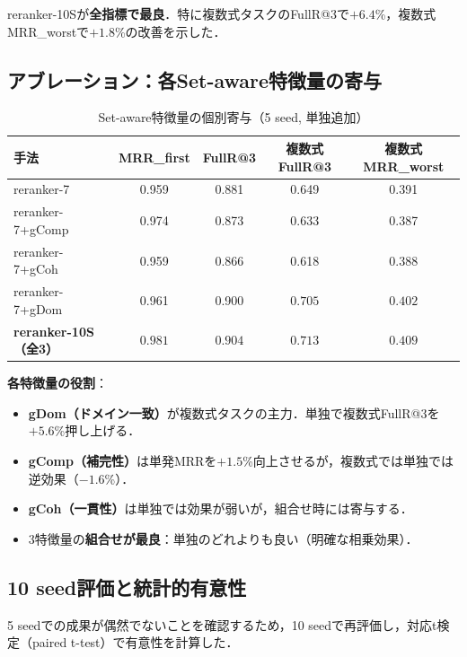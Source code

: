 \documentclass[11pt,a4paper]{ltjsarticle}
\begin{document}
reranker-10Sが\textbf{全指標で最良}．特に複数式タスクのFullR@3で$+6.4$\%，複数式MRR\_worstで$+1.8$\%の改善を示した．

\subsection{アブレーション：各Set-aware特徴量の寄与}

\begin{table}[h]
\centering
\caption{Set-aware特徴量の個別寄与（5 seed, 単独追加）}
\small
\begin{tabular}{lcccc}
\toprule
手法 & MRR\_first & FullR@3 & 複数式FullR@3 & 複数式MRR\_worst \\
\midrule
reranker-7 & 0.959 & 0.881 & 0.649 & 0.391 \\
reranker-7+gComp & 0.974 & 0.873 & 0.633 & 0.387 \\
reranker-7+gCoh & 0.959 & 0.866 & 0.618 & 0.388 \\
reranker-7+gDom & 0.961 & 0.900 & $\mathbf{0.705}$ & $\mathbf{0.402}$ \\
\textbf{reranker-10S（全3）} & $\mathbf{0.981}$ & $\mathbf{0.904}$ & $\mathbf{0.713}$ & $\mathbf{0.409}$ \\
\bottomrule
\end{tabular}
\end{table}

\textbf{各特徴量の役割}：
\begin{itemize}[leftmargin=2em, nosep]
  \item \textbf{gDom（ドメイン一致）}が複数式タスクの主力．単独で複数式FullR@3を$+5.6$\%押し上げる．
  \item \textbf{gComp（補完性）}は単発MRRを$+1.5$\%向上させるが，複数式では単独では逆効果（$-1.6$\%）．
  \item \textbf{gCoh（一貫性）}は単独では効果が弱いが，組合せ時には寄与する．
  \item 3特徴量の\textbf{組合せが最良}：単独のどれよりも良い（明確な相乗効果）．
\end{itemize}

\subsection{10 seed評価と統計的有意性}

5 seedでの成果が偶然でないことを確認するため，10 seedで再評価し，対応t検定（paired t-test）で有意性を計算した．
\end{document}
